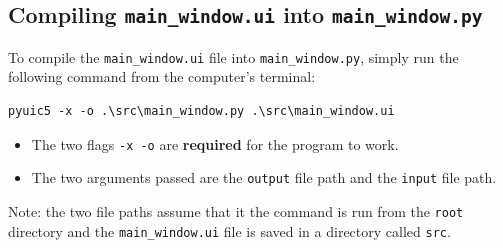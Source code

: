 \documentclass[11pt]{article}
\makeatletter
\providecommand{\tightlist}{%
      \setlength{\itemsep}{0pt}\setlength{\parskip}{0pt}}
\newcommand{\boxspacing}{\kern\kvtcb@left@rule\kern\kvtcb@boxsep}
\newcommand{\prompt}[4]{
        \ttfamily\llap{{\color{#2}[#3]:\hspace{3pt}#4}}\vspace{-\baselineskip}
    }
\makeatother
\begin{document}
    \hypertarget{compiling-main_window.ui-into-main_window.py}{%
\subsection{\texorpdfstring{Compiling \texttt{main\_window.ui} into
\texttt{main\_window.py}}{Compiling main\_window.ui into main\_window.py}}\label{compiling-main_window.ui-into-main_window.py}}

    To compile the \texttt{main\_window.ui} file into
\texttt{main\_window.py}, simply run the following command from the
computer's terminal:

\begin{verbatim}
pyuic5 -x -o .\src\main_window.py .\src\main_window.ui
\end{verbatim}

\begin{itemize}
\tightlist
\item
  The two flags \texttt{-x\ -o} are \textbf{required} for the program to
  work.
\item
  The two arguments passed are the \texttt{output} file path and the
  \texttt{input} file path.
\end{itemize}

Note: the two file paths assume that it the command is run from the
\texttt{root} directory and the \texttt{main\_window.ui} file is saved
in a directory called \texttt{src}.

    \begin{tcolorbox}[breakable, size=fbox, boxrule=1pt, pad at break*=1mm,colback=cellbackground, colframe=cellborder]
\prompt{In}{incolor}{ }{\boxspacing}
\begin{Verbatim}[commandchars=\\\{\}]

\end{Verbatim}
\end{tcolorbox}


    
    
    
\end{document}
